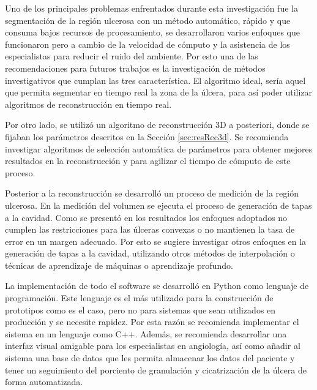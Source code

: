 \begin{recomendations}
	
Uno de los principales problemas enfrentados durante esta investigación fue la segmentación de la región ulcerosa con un método automático, rápido  y que consuma bajos recursos de procesamiento, se desarrollaron varios enfoques que funcionaron pero a cambio de la velocidad de cómputo y la asistencia de los especialistas para reducir el ruido del ambiente. Por esto una de las recomendaciones para futuros trabajos es la investigación de métodos investigativos que cumplan las tres característica. El algoritmo ideal, sería aquel que permita segmentar en tiempo real la zona de la úlcera, para así poder utilizar algoritmos de reconstrucción en tiempo real.

Por otro lado, se utilizó un algoritmo de reconstrucción 3D a posteriori, donde se fijaban los parámetros descritos en la Sección \ref{sec:resRec3d}. Se recomienda investigar algoritmos de selección automática de parámetros para obtener mejores resultados en la reconstrucción y para agilizar el tiempo de cómputo de este proceso.

Posterior a la reconstrucción se desarrolló un proceso de medición de la región ulcerosa. En la medición del volumen se ejecuta el proceso de generación de tapas a la cavidad. Como se presentó en los resultados los enfoques adoptados no cumplen las restricciones para las úlceras convexas o no mantienen la tasa de error en un margen adecuado. Por esto se sugiere investigar otros enfoques en la generación de tapas a la cavidad, utilizando otros métodos de interpolación o técnicas de aprendizaje de máquinas o aprendizaje profundo.

La implementación de todo el software se desarrolló en Python como lenguaje de programación. Este lenguaje es el más utilizado para la construcción de prototipos como es el caso, pero no para sistemas que sean utilizados en producción y se necesite rapidez. Por esta razón se recomienda implementar el sistema en un lenguaje como C++. Además, se recomienda desarrollar una interfaz visual amigable para los especialistas en angiología, así como añadir al sistema una base de datos que les permita almacenar los datos del paciente y tener un seguimiento del porciento de granulación y cicatrización de la úlcera de forma automatizada.
\end{recomendations}
